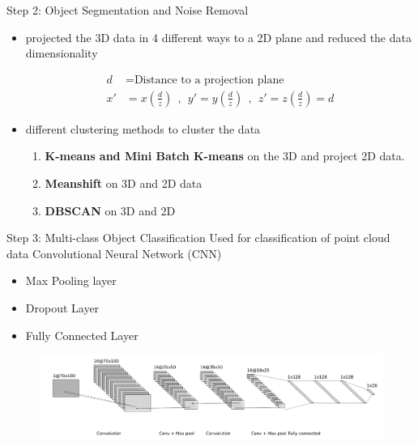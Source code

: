 \documentclass[9pt]{beamer}
\begin{document}
\begin{frame}[fragile]{Step 2: Object Segmentation and Noise Removal}
	\begin{itemize}
		\item {} projected the 3D data in 4 different ways to a 2D plane and reduced the data dimensionality
		
		\begin{align*}
		d  & = \text{Distance to a projection plane} \\
		x' & =  x (\frac{d}{z}) \ \  , \ \  y' =  y (\frac{d}{z}) \ \  , \ \  z'=  z (\frac{d}{z}) = d
		\end{align*}
		
		
		\item {} different clustering methods to cluster the data		
		\begin{enumerate}
			\item \textbf{K-means and Mini Batch K-means} on the 3D and project 2D data.
			\item \textbf{Meanshift} on 3D and 2D data
			\item \textbf{DBSCAN} on 3D and 2D
		\end{enumerate}
	\end{itemize}
\end{frame}


\begin{frame}[fragile]{Step 3: Multi-class Object Classification}	
	Used for classification of point cloud data Convolutional Neural Network (CNN) 
	
	\begin{itemize}
		\item Max Pooling layer
		\item Dropout Layer
		\item Fully Connected Layer  
	\end{itemize}
	
	\begin{figure}
		\centering
		\includegraphics[width=\textwidth]{images/object_net.pdf}
		
	\end{figure}
\end{frame}
\end{document}
